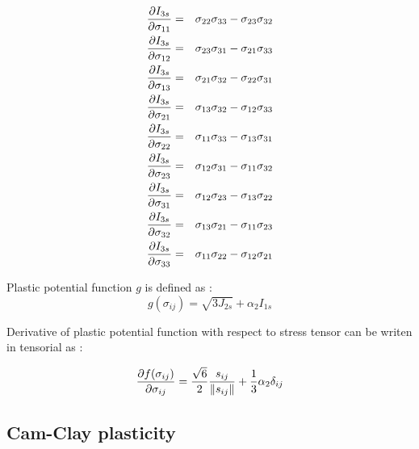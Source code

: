 \begin{eqnarray}
\mbox{$\displaystyle\frac{\partial{I_{3s}}}{\partial{\sigma_{11}}}$} &=& \sigma_{22}\sigma_{33} - \sigma_{23}\sigma_{32}
\\
\mbox{$\displaystyle\frac{\partial{I_{3s}}}{\partial{\sigma_{12}}}$} &=& \sigma_{23}\sigma_{31} - \sigma_{21}\sigma_{33}
\\
\mbox{$\displaystyle\frac{\partial{I_{3s}}}{\partial{\sigma_{13}}}$} &=& \sigma_{21}\sigma_{32} - \sigma_{22}\sigma_{31}
\\
\mbox{$\displaystyle\frac{\partial{I_{3s}}}{\partial{\sigma_{21}}}$} &=& \sigma_{13}\sigma_{32} - \sigma_{12}\sigma_{33}
\\
\mbox{$\displaystyle\frac{\partial{I_{3s}}}{\partial{\sigma_{22}}}$} &=& \sigma_{11}\sigma_{33} - \sigma_{13}\sigma_{31}
\\
\mbox{$\displaystyle\frac{\partial{I_{3s}}}{\partial{\sigma_{23}}}$} &=& \sigma_{12}\sigma_{31} - \sigma_{11}\sigma_{32}
\\
\mbox{$\displaystyle\frac{\partial{I_{3s}}}{\partial{\sigma_{31}}}$} &=& \sigma_{12}\sigma_{23} - \sigma_{13}\sigma_{22}
\\
\mbox{$\displaystyle\frac{\partial{I_{3s}}}{\partial{\sigma_{32}}}$} &=& \sigma_{13}\sigma_{21} - \sigma_{11}\sigma_{23}
\\
\mbox{$\displaystyle\frac{\partial{I_{3s}}}{\partial{\sigma_{33}}}$} &=& \sigma_{11}\sigma_{22} - \sigma_{12}\sigma_{21}
\end{eqnarray}

Plastic potential function $g$ is defined as :
\begin{equation}
g(\sigma_{ij}) = \sqrt{3 J_{2s}} + \alpha_2 I_{1s}
\end{equation}


Derivative of plastic potential function with respect to stress tensor can be writen in tensorial as :

\begin{equation}
\mbox{$\displaystyle\frac{\partial{f(\sigma_{ij})}}{\partial{\sigma_{ij}}}$} = \mbox{$\displaystyle\frac{\sqrt{6}}{2}$}\mbox{$\displaystyle\frac{s_{ij}}{\|s_{ij}\|}$} + \mbox{$\displaystyle\frac{1}{3}$} \alpha_2 \delta_{ij}
\end{equation}

\subsection{Cam-Clay plasticity}
\label{sectcamclaymodel}

